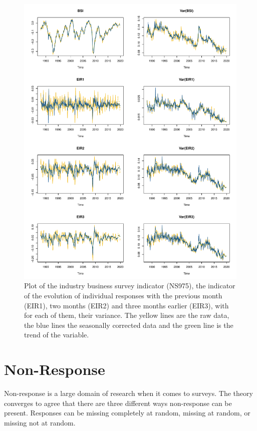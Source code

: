 \documentclass[12pt,a4paper,oneside]{book}
\begin{document}
\begin{figure}[htp!]
    \centering
    \includegraphics[scale=0.75]{Graphs/RJDemetra_plots.pdf}
    \caption{Plot of the industry business survey indicator (NS975), the indicator of the evolution of individual responses with the previous month (EIR1), two months (EIR2) and three months earlier (EIR3), with for each of them, their variance. The yellow lines are the raw data, the blue lines the seasonally corrected data and the green line is the trend of the variable.}
    \label{fig:seasonal ajusted rjdemetra}
\end{figure}


\section{Non-Response}

Non-response is a large domain of research when it comes to surveys. 
The theory converges to agree that there are three different ways non-response can be present. Responses can be missing completely at random, missing at random, or missing not at random.
\end{document}
